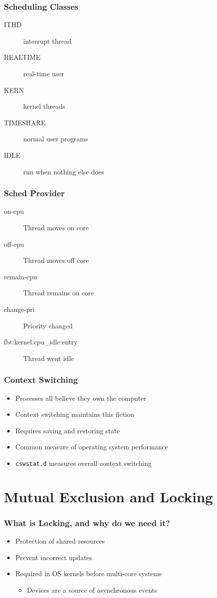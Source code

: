 \documentclass[pdftex]{beamer} %
\begin{document}
\begin{frame}
  \frametitle{Scheduling Classes}
  \begin{description}
  \item[ITHD] interrupt thread
  \item[REALTIME] real-time user
  \item[KERN] kernel threads
  \item[TIMESHARE] normal user programs
  \item[IDLE] run when nothing else does
  \end{description}
\end{frame}

\begin{frame}[fragile]
  \frametitle{Sched Provider}
  \begin{description}
  \item[on-cpu] Thread moves on core
  \item[off-cpu] Thread moves off core
  \item[remain-cpu] Thread remains on core
  \item[change-pri] Priority changed
  \item[fbt:kernel:cpu\_idle:entry] Thread went idle
  \end{description}
\end{frame}

\begin{frame}[fragile]
  \frametitle{Context Switching}
  \begin{itemize}
  \item Processes all believe they own the computer
  \item Context switching maintains this fiction
  \item Requires saving and restoring state
  \item Common measure of operating system performance
  \item \verb+cswstat.d+ measures overall context switching
  \end{itemize}
\end{frame}

\section{Mutual Exclusion and Locking}
\label{sec:locking}

\begin{frame}
  \frametitle{What is Locking, and why do we need it?}
  \begin{itemize}
  \item Protection of shared resources
  \item Prevent incorrect updates
  \item Required in OS kernels before multi-core systems
    \begin{itemize}
    \item Devices are a source of asynchronous events
    \end{itemize}
  \end{itemize}
\end{frame}
\end{document}
